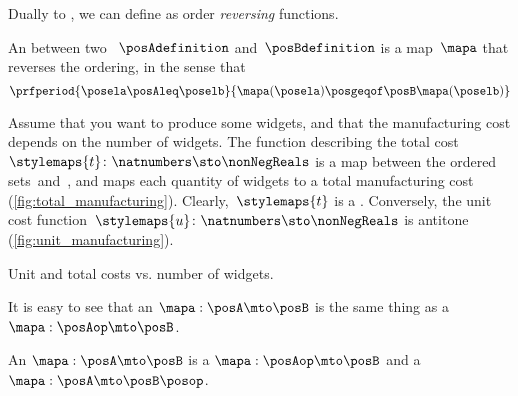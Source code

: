 Dually to , we can define  as order \emph{reversing} functions.

\begin{definition}
    \label{def:antitone}
    An  between two ~$\posAdefinition$ and~$\posBdefinition$ is a map~$\mapa$ that reverses the ordering, in the sense that
    \begin{equation}
        \prfperiod{
            \posela \posAleq \poselb
        }{
            \mapa(\posela) \posgeqof\posB \mapa(\poselb)
        }
    \end{equation}
\end{definition}

\begin{example}
    Assume that you want to produce some widgets, and that the manufacturing cost depends on the number of widgets.
    The function describing the total cost~$\stylemaps{t}\colon \natnumbers \sto \nonNegReals$ is a map between the ordered sets~\natnumbers and~\nonNegReals, and maps each quantity of widgets to a total manufacturing cost (\cref{fig:total_manufacturing}).
    Clearly,~$\stylemaps{t}$ is a .
    Conversely, the unit cost function~$\stylemaps{u}\colon \natnumbers \sto \nonNegReals$ is antitone (\cref{fig:unit_manufacturing}).
\end{example}

\begin{marginfigure}

    \caption{Unit and total costs vs. number of widgets.}
\end{marginfigure}

It is easy to see that an  $\mapa: \posA \mto \posB$ is the same thing as a  $\mapa: \posAop \mto \posB$.

\begin{lemma}\label{lem:antitone-is-monotone}
    An  $\mapa: \posA \mto \posB$ is a  $\mapa: \posAop \mto \posB$
    and a  $\mapa: \posA \mto \posB\posop$.
\end{lemma}


